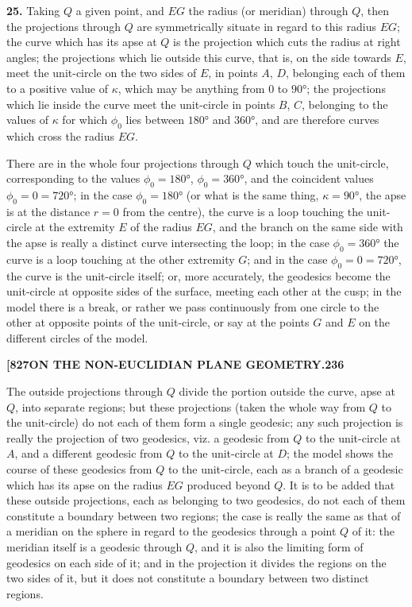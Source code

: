 \documentclass[12pt,a4paper]{article}
\theoremstyle{definition}
\begin{document}
\noindent\textbf{25.} Taking $Q$ a given point, and $EG$ the radius (or meridian) through $Q$, then the projections through $Q$ are symmetrically situate in regard to this radius $EG$; the curve which has its apse at $Q$ is the projection which cuts the radius at right angles; the projections which lie outside this curve, that is, on the side towards $E$, meet the unit-circle on the two sides of $E$, in points $A$, $D$, belonging each of them to a positive value of $\kappa$, which may be anything from $0$ to $90°$; the projections which lie inside the curve meet the unit-circle in points $B$, $C$, belonging to the values of $\kappa$ for which $\phi_0$ lies between $180°$ and $360°$, and are therefore curves which cross the radius $EG$.

There are in the whole four projections through $Q$ which touch the unit-circle, corresponding to the values $\phi_0 = 180°$, $\phi_0 = 360°$, and the coincident values $\phi_0 = 0 = 720°$; in the case $\phi_0 = 180°$ (or what is the same thing, $\kappa = 90°$, the apse is at the distance $r = 0$ from the centre), the curve is a loop touching the unit-circle at the extremity $E$ of the radius $EG$, and the branch on the same side with the apse is really a distinct curve intersecting the loop; in the case $\phi_0 = 360°$ the curve is a loop touching at the other extremity $G$; and in the case $\phi_0 = 0 = 720°$, the curve is the unit-circle itself; or, more accurately, the geodesics become the unit-circle at opposite sides of the surface, meeting each other at the cusp; in the model there is a break, or rather we pass continuously from one circle to the other at opposite points of the unit-circle, or say at the points $G$ and $E$ on the different circles of the model.

\newpage
\setcounter{page}{236}

\noindent\textbf{[827}\hfill\textbf{ON THE NON-EUCLIDIAN PLANE GEOMETRY.}\hfill\textbf{236}

\bigskip

\noindent The outside projections through $Q$ divide the portion outside the curve, apse at $Q$, into separate regions; but these projections (taken the whole way from $Q$ to the unit-circle) do not each of them form a single geodesic; any such projection is really the projection of two geodesics, viz. a geodesic from $Q$ to the unit-circle at $A$, and a different geodesic from $Q$ to the unit-circle at $D$; the model shows the course of these geodesics from $Q$ to the unit-circle, each as a branch of a geodesic which has its apse on the radius $EG$ produced beyond $Q$. It is to be added that these outside projections, each as belonging to two geodesics, do not each of them constitute a boundary between two regions; the case is really the same as that of a meridian on the sphere in regard to the geodesics through a point $Q$ of it: the meridian itself is a geodesic through $Q$, and it is also the limiting form of geodesics on each side of it; and in the projection it divides the regions on the two sides of it, but it does not constitute a boundary between two distinct regions.
\end{document}
